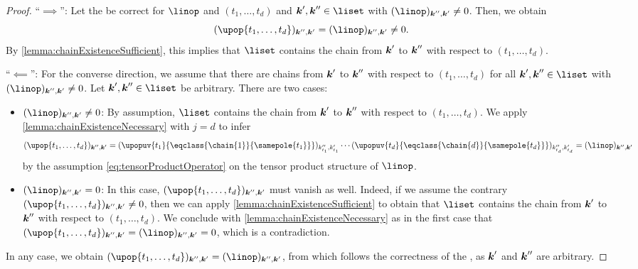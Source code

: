 \begin{proof}
  ``$\implies$'':
  Let the \up be correct for $\linop$ and $(t_1, \dotsc, t_d)$
  and $\*k', \*k'' \in \liset$ with $(\linop)_{\*k'',\*k'} \not= 0$.
  Then, we obtain
  \begin{equation}
    (\upop{t_1,\dotsc,t_d})_{\*k'',\*k'}
    = (\linop)_{\*k'',\*k'}
    \not= 0.
  \end{equation}
  By \cref{lemma:chainExistenceSufficient},
  this implies that $\liset$ contains the chain from ${\boldsymbol{k}}'$ to ${\boldsymbol{k}}''$
  with respect to $(t_1, \dotsc, t_d)$.
  
  ``$\impliedby$'':
  For the converse direction, we assume that there are chains
  from ${\boldsymbol{k}}'$ to ${\boldsymbol{k}}''$ with respect to $(t_1, \dotsc, t_d)$
  for all $\*k', \*k'' \in \liset$ with $(\linop)_{\*k'',\*k'} \not= 0$.
  Let $\*k', \*k'' \in \liset$ be arbitrary.
  There are two cases:
  \begin{itemize}
    \item
    $(\linop)_{\*k'',\*k'} \not= 0$:
    By assumption, $\liset$ contains the chain from ${\boldsymbol{k}}'$ to ${\boldsymbol{k}}''$
    with respect to $(t_1, \dotsc, t_d)$.
    We apply \cref{lemma:chainExistenceNecessary} with $j = d$
    to infer
    \begin{equation}
      (\upop{t_1,\dotsc,t_d})_{\*k'',\*k'}
      =
      (\upopuv{t_1}{\eqclass{\chain{1}}{\samepole{t_1}}})_{k''_{t_1},k'_{t_1}}
      \dotsm
      (\upopuv{t_d}{\eqclass{\chain{d}}{\samepole{t_d}}})_{k''_{t_d},k'_{t_d}}
      = (\linop)_{\*k'',\*k'}
    \end{equation}
    by the assumption \cref{eq:tensorProductOperator} on
    the tensor product structure of $\linop$.
    
    \item
    $(\linop)_{\*k'',\*k'} = 0$:
    In this case, $(\upop{t_1,\dotsc,t_d})_{\*k'',\*k'}$ must vanish as well.
    Indeed, if we assume the contrary
    $(\upop{t_1,\dotsc,t_d})_{\*k'',\*k'} \not= 0$,
    then we can apply \cref{lemma:chainExistenceSufficient}
    to obtain that $\liset$ contains the chain from ${\boldsymbol{k}}'$ to ${\boldsymbol{k}}''$
    with respect to $(t_1, \dotsc, t_d)$.
    We conclude with \cref{lemma:chainExistenceNecessary} as in the first case
    that $(\upop{t_1,\dotsc,t_d})_{\*k'',\*k'} = (\linop)_{\*k'',\*k'} = 0$,
    which is a contradiction.
  \end{itemize}
  In any case, we obtain
  $(\upop{t_1,\dotsc,t_d})_{\*k'',\*k'} = (\linop)_{\*k'',\*k'}$,
  from which follows the correctness of the \up\periodafterPspace,
  as ${\boldsymbol{k}}'$ and ${\boldsymbol{k}}''$ are arbitrary.
\end{proof}



